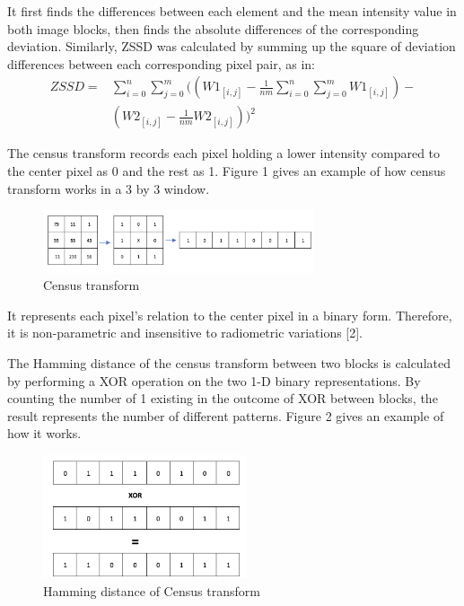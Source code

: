 \documentclass[conference]{IEEEtran}
\begin{document}
It first finds the differences between each element and the mean intensity value in both image blocks, then finds the absolute differences of the corresponding deviation. Similarly, ZSSD was calculated by summing up the square of deviation differences between each corresponding pixel pair, as in:
\begin{equation*}
    \begin{aligned}
        ZSSD= {} & \sum^{n}_{i=0}\sum^{m}_{j=0}((W1_{[i,j]}-\frac{1}{nm}\sum^{n}_{i=0}\sum^{m}_{j=0}W1_{[i,j]})- \\
        & (W2_{[i,j]}-\frac{1}{nm}W2_{[i,j]}))^2
    \end{aligned}
\end{equation*}

The census transform records each pixel holding a lower intensity compared to the center pixel as 0 and the rest as 1. Figure 1 gives an example of how census transform works in a 3 by 3 window.

\begin{figure}[H]
    \centering
    \includegraphics[width=8cm]{fig1.png}
    \caption{Census transform}
\end{figure}

It represents each pixel's relation to the center pixel in a binary form. Therefore, it is non-parametric and insensitive to radiometric variations [2].

The Hamming distance of the census transform between two blocks is calculated by performing a XOR operation on the two 1-D binary representations. By counting the number of 1 existing in the outcome of XOR between blocks, the result represents the number of different patterns. Figure 2 gives an example of how it works.

\begin{figure}[H]
    \centering
    \includegraphics[width=6cm]{fig2.png}
    \caption{Hamming distance of Census transform}
\end{figure}
\end{document}
